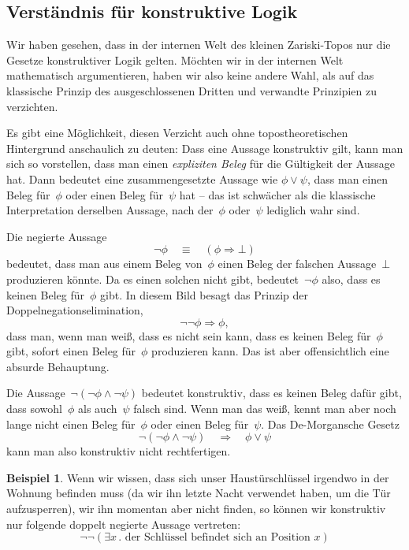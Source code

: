 \documentclass[a4paper,ngerman,12pt]{scrartcl}
\theoremstyle{definition}
\newtheorem{bsp}[defn]{Beispiel}
\theoremstyle{plain}
\theoremstyle{remark}
\renewcommand{\_}{\mathpunct{.}\,}
\newcommand{\?}{\,{:}\,}
\begin{document}
\subsection*{Verständnis für konstruktive Logik}

Wir haben gesehen, dass in der internen Welt des kleinen Zariski-Topos nur die
Gesetze konstruktiver Logik gelten. Möchten wir in der internen Welt
mathematisch argumentieren, haben wir also keine andere Wahl, als auf das
klassische Prinzip des ausgeschlossenen Dritten und verwandte Prinzipien zu
verzichten.

Es gibt eine Möglichkeit, diesen Verzicht auch ohne topostheoretischen
Hintergrund anschaulich zu deuten: Dass eine Aussage konstruktiv gilt, kann man
sich so vorstellen, dass man einen \emph{expliziten Beleg} für die Gültigkeit
der Aussage hat. Dann bedeutet eine zusammengesetzte Aussage
wie $\phi \vee \psi$,
dass man einen Beleg für~$\phi$ oder einen Beleg für~$\psi$ hat -- das ist
schwächer als die klassische Interpretation derselben Aussage, nach der~$\phi$
oder~$\psi$ lediglich wahr sind.

Die negierte Aussage
\[ \neg\phi \quad\equiv\quad (\phi \Rightarrow \bot) \]
bedeutet, dass man aus einem Beleg von~$\phi$ einen Beleg der falschen
Aussage~$\bot$ produzieren könnte. Da es einen solchen nicht gibt,
bedeutet~$\neg\phi$ also, dass es keinen Beleg für~$\phi$ gibt.
In diesem Bild besagt das Prinzip der Doppelnegationselimination,
\[ \neg\neg\phi \Longrightarrow \phi, \]
dass man, wenn man weiß, dass es nicht sein kann, dass es keinen Beleg
für~$\phi$ gibt, sofort einen Beleg für~$\phi$ produzieren kann. Das ist aber
offensichtlich eine absurde Behauptung.

Die Aussage~$\neg(\neg\phi \wedge \neg\psi)$ bedeutet konstruktiv, dass es
keinen Beleg dafür gibt, dass sowohl~$\phi$ als auch~$\psi$ falsch sind. Wenn
man das weiß, kennt man aber noch lange nicht einen Beleg für~$\phi$ oder einen
Beleg für~$\psi$. Das De-Morgansche Gesetz
\[ \neg(\neg\phi \wedge \neg\psi) \quad\Longrightarrow\quad \phi \vee \psi \]
kann man also konstruktiv nicht rechtfertigen.

\begin{bsp}Wenn wir wissen, dass sich unser Haustürschlüssel irgendwo in der
Wohnung befinden muss (da wir ihn letzte Nacht verwendet haben, um die Tür
aufzusperren), wir ihn momentan aber nicht finden, so können wir konstruktiv
nur folgende doppelt negierte Aussage vertreten:
\[ \neg\neg (\exists x\_ \text{der Schlüssel befindet sich an Position~$x$})
\]
\end{bsp}
\end{document}
